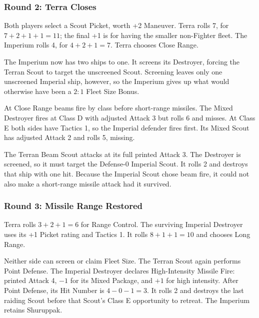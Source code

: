 \subsubsection{Round 2: Terra Closes}

Both players select a Scout Picket, worth +2 Maneuver. Terra rolls 7, for
$7+2+1+1=11$; the final +1 is for having the smaller non-Fighter fleet. The
Imperium rolls 4, for $4+2+1=7$. Terra chooses Close Range.

The Imperium now has two ships to one. It screens its Destroyer, forcing the
Terran Scout to target the unscreened Scout. Screening leaves only one
unscreened Imperial ship, however, so the Imperium gives up what would
otherwise have been a $2{:}1$ Fleet Size Bonus.

At Close Range beams fire by class before short-range missiles. The Mixed
Destroyer fires at Class D with adjusted Attack 3 but rolls 6 and misses. At
Class E both sides have Tactics 1, so the Imperial defender fires first. Its
Mixed Scout has adjusted Attack 2 and rolls 5, missing.

The Terran Beam Scout attacks at its full printed Attack 3. The Destroyer is
screened, so it must target the Defense-0 Imperial Scout. It rolls 2 and
destroys that ship with one hit. Because the Imperial Scout chose beam fire,
it could not also make a short-range missile attack had it survived.

\subsubsection{Round 3: Missile Range Restored}

Terra rolls $3+2+1=6$ for Range Control. The surviving Imperial Destroyer uses
its +1 Picket rating and Tactics 1. It rolls $8+1+1=10$ and chooses Long Range.

Neither side can screen or claim Fleet Size. The Terran Scout again performs
Point Defense. The Imperial Destroyer declares High-Intensity Missile Fire:
printed Attack 4, $-1$ for its Mixed Package, and $+1$ for high intensity.
After Point Defense, its Hit Number is $4-0-1=3$. It rolls 2 and destroys the
last raiding Scout before that Scout's Class E opportunity to retreat. The
Imperium retains Shuruppak.

\begin{center}
\end{center}

